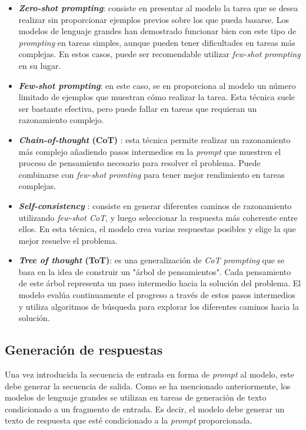 \documentclass[11pt,spanish,listoffigures,listoftables]{tfgetsinf}
\begin{document}
\begin{itemize}
	\item \textbf{\textit{Zero-shot prompting}}: consiste en presentar al modelo la tarea que se desea realizar sin proporcionar ejemplos previos sobre los que pueda basarse. Los modelos de lenguaje grandes han demostrado funcionar bien con este tipo de \textit{prompting} en tareas simples, aunque pueden tener dificultades en tareas más complejas. En estos casos, puede ser recomendable utilizar \textit{few-shot prompting} en su lugar.
	\item \textbf{\textit{Few-shot prompting}}: en este caso, se en proporciona al modelo un número limitado de ejemplos que muestran cómo realizar la tarea. Esta técnica suele ser bastante efectiva,  pero puede fallar en tareas que requieran un razonamiento complejo.
	\item \textbf{\textit{Chain-of-thought} (CoT)} \cite{wei2023chainofthoughtpromptingelicitsreasoning}: esta técnica permite realizar un razonamiento más complejo añadiendo pasos intermedios en la \textit{prompt} que muestren el proceso de pensamiento necesario para resolver el problema. Puede combinarse con \textit{few-shot promting} para tener mejor rendimiento en tareas complejas.
	\item \textbf{\textit{Self-consistency}} \cite{wang2023selfconsistencyimproveschainthought}: consiste en generar diferentes caminos de razonamiento utilizando \textit{few-shot CoT}, y luego seleccionar la respuesta más coherente entre ellos. En esta técnica, el modelo crea varias respuestas posibles y elige la que mejor resuelve el problema.
	\item \textbf{\textit{Tree of thought} (ToT)}:  es una generalización de \textit{CoT prompting} que se basa en la idea de construir un "árbol de pensamientos". Cada pensamiento de este árbol representa un paso intermedio hacia la solución del problema. El modelo evalúa continuamente el progreso a través de estos pasos intermedios y utiliza algoritmos de búsqueda para explorar los diferentes caminos hacia la solución.
\end{itemize}

\subsection{Generación de respuestas}

Una vez introducida la secuencia de entrada en forma de \textit{prompt} al modelo, este debe generar la secuencia de salida. Como se ha mencionado anteriormente, los modelos de lenguaje grandes se utilizan en tareas de generación de texto condicionado a un fragmento de entrada. Es decir, el modelo debe generar un texto de respuesta que esté condicionado a la \textit{prompt} proporcionada.
\end{document}
